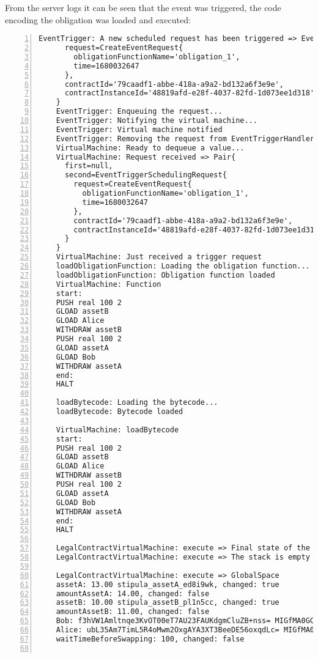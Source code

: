 From the server logs it can be seen that the event was triggered, the code encoding the obligation was 
loaded and executed:
{
  \small
  \begin{Verbatim}[numbers=left,xleftmargin=1cm,firstnumber=1,breaklines=true,breakanywhere=true,tabsize=2]
    EventTrigger: A new scheduled request has been triggered => EventTriggerSchedulingRequest{
      request=CreateEventRequest{
        obligationFunctionName='obligation_1', 
        time=1680032647
      }, 
      contractId='79caadf1-abbe-418a-a9a2-bd132a6f3e9e', 
      contractInstanceId='48819afd-e28f-4037-82fd-1d073ee1d318'
    }
    EventTrigger: Enqueuing the request...
    EventTrigger: Notifying the virtual machine...
    EventTrigger: Virtual machine notified
    EventTrigger: Removing the request from EventTriggerHandler...
    VirtualMachine: Ready to dequeue a value...
    VirtualMachine: Request received => Pair{
      first=null, 
      second=EventTriggerSchedulingRequest{
        request=CreateEventRequest{
          obligationFunctionName='obligation_1', 
          time=1680032647
        }, 
        contractId='79caadf1-abbe-418a-a9a2-bd132a6f3e9e', 
        contractInstanceId='48819afd-e28f-4037-82fd-1d073ee1d318'
      }
    }
    VirtualMachine: Just received a trigger request
    loadObligationFunction: Loading the obligation function...
    loadObligationFunction: Obligation function loaded
    VirtualMachine: Function
    start:
    PUSH real 100 2
    GLOAD assetB
    GLOAD Alice
    WITHDRAW assetB
    PUSH real 100 2
    GLOAD assetA
    GLOAD Bob
    WITHDRAW assetA
    end:
    HALT
  
    loadBytecode: Loading the bytecode...
    loadBytecode: Bytecode loaded
  
    VirtualMachine: loadBytecode
    start:
    PUSH real 100 2
    GLOAD assetB
    GLOAD Alice
    WITHDRAW assetB
    PUSH real 100 2
    GLOAD assetA
    GLOAD Bob
    WITHDRAW assetA
    end:
    HALT
  
    LegalContractVirtualMachine: execute => Final state of the execution below
    LegalContractVirtualMachine: execute => The stack is empty
  
    LegalContractVirtualMachine: execute => GlobalSpace
    assetA: 13.00 stipula_assetA_ed8i9wk, changed: true
    amountAssetA: 14.00, changed: false
    assetB: 10.00 stipula_assetB_pl1n5cc, changed: true
    amountAssetB: 11.00, changed: false
    Bob: f3hVW1Amltnqe3KvOT00eT7AU23FAUKdgmCluZB+nss= MIGfMA0GCSqGSIb3DQEBAQUAA4GNADCBiQKBgQDErzzgD2ZslZxciFAiX3/ot7lrkZDw4148jFZrsDZPE6CVs9xXFSHGgy/mFvIFLXhnChO6Nyd2be3lbgeavLMCMVUiTStXr117Km17keWpb3sItkKKsLFBOcIIU8XXowI/OhzQN2XPZYESHgjdQ5vwEj2YyueiS7WKP94YWz/pswIDAQAB, changed: false
    Alice: ubL35Am7TimL5R4oMwm2OxgAYA3XT3BeeDE56oxqdLc= MIGfMA0GCSqGSIb3DQEBAQUAA4GNADCBiQKBgQCo/GjVKS+3gAA55+kko41yINdOcCLQMSBQyuTTkKHE1mhu/TgOpivM0wLPsSga8hQMr3+v3aR0IF/vfCRf6SdiXmWx/jflmEXtnT6fkGcnV6dGNUpHWXSpwUIDt0N88jfnEqekx4S+KDCKg99sGEeHeT65fKS8lB0gjHMt9AOriwIDAQAB, changed: false
    waitTimeBeforeSwapping: 100, changed: false
  

\end{Verbatim}}
